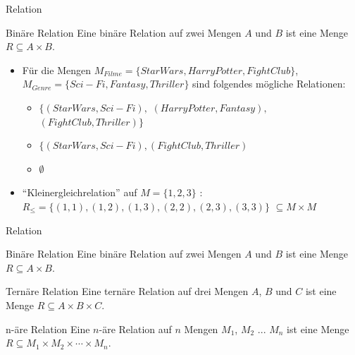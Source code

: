 \documentclass{beamer}
\begin{document}
\begin{frame}{Relation}
	 
	
	\begin{block}{Binäre Relation}
		Eine binäre Relation auf zwei Mengen $A$ und $B$ ist eine Menge $R \subseteq A \times B$.
	\end{block} 
	
	\begin{itemize}
		\item Für die Mengen $M_{Filme} = \{Star Wars, Harry Potter, Fight Club\}$, $M_{Genre} = \{Sci-Fi, Fantasy, Thriller\}$ sind folgendes mögliche Relationen:
		\begin{itemize}
			\item $\{(Star Wars, Sci-Fi),$ $(Harry Potter, Fantasy),$ $(Fight Club, Thriller)\}$
			\item $\{(Star Wars, Sci-Fi), (Fight Club, Thriller)$
			\item $\emptyset$
		\end{itemize}
		\item ``Kleinergleichrelation'' auf $M = \{1, 2, 3\}$  : $R_\leq = \{(1, 1), (1, 2), (1, 3), (2, 2), (2, 3), (3, 3)\}$   $\subseteq M \times M$
	\end{itemize}
\end{frame}


\begin{frame}{Relation}
	\begin{block}{Binäre Relation}
		Eine binäre Relation auf zwei Mengen $A$ und $B$ ist eine Menge $R \subseteq A \times B$.
	\end{block} 
	
	\begin{block}{Ternäre Relation}
		Eine ternäre Relation auf drei Mengen $A$, $B$ und $C$ ist eine Menge $R \subseteq A \times B \times C$.
	\end{block} 
	
	\begin{block}{n-äre Relation}
		Eine $n$-äre Relation auf $n$ Mengen $M_1$, $M_2$ ... $M_n$ ist eine Menge $R \subseteq M_1 \times M_2 \times \cdots \times M_n$.
	\end{block}
\end{frame}
\end{document}
